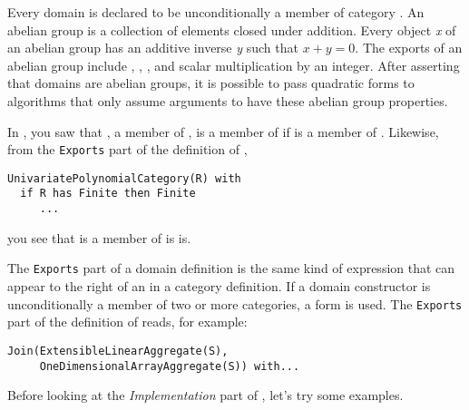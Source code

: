 {{{{Every  domain is declared
to be unconditionally a member of category .
An abelian group is a collection of elements closed under
addition.
Every object {\it x} of an abelian group has an additive inverse
{\it y} such that $x + y = 0$.
The exports of an abelian group include ,
\spadop{+}, \spadop{-}, and scalar multiplication by an integer.
After asserting that  domains are abelian
groups, it is possible to pass quadratic forms to algorithms that
only assume arguments to have these abelian group
properties.

In , you saw that
, a member of
,
is a member of  if 
is a member of .
Likewise, from the {\tt Exports} part of the definition of
,
\begin{verbatim}
UnivariatePolynomialCategory(R) with
  if R has Finite then Finite
     ...
\end{verbatim}
you see that  is a member of
 is  is.

The {\tt Exports} part of a domain definition is
the same kind of
expression that can appear to the right of an
\spadSyntax{==} in a category definition.
If a domain constructor is unconditionally a member of two or more
categories, a  form is used.
The {\tt Exports} part of the definition of
 reads, for example:
\begin{verbatim}
Join(ExtensibleLinearAggregate(S),
     OneDimensionalArrayAggregate(S)) with...
\end{verbatim}

%
Before looking at the {\it Implementation} part of ,
let's try some examples.

}}}}
